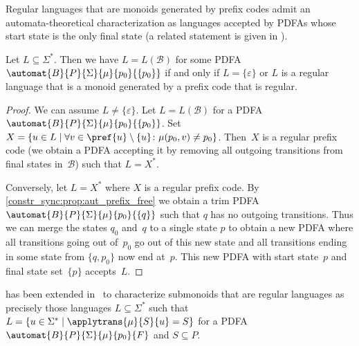 Regular languages that are monoids generated by prefix codes
admit an automata-theoretical characterization 
as languages
accepted by PDFAs
whose start state is the only final state (a related statement
is given in \cite[Prop.~3.2]{Eilenberg1974}).

\begin{theorem}
	\label{constr_sync:thm:regular_prefix_codes_and_automata}
	Let $L \subseteq \Sigma^*$.
	Then we have $L = L(\mathcal B)$
	for some PDFA $\automat{B}{P}{\Sigma}{\mu}{p_0}{\{p_0\}}$
	if and only if  $L = \{\varepsilon\}$ or $L$ is a regular language that is a monoid generated by a prefix code that is regular.
\end{theorem}
\begin{proof}	
	We can assume $L \ne \{\varepsilon\}$. Let $L = L(\mathcal B)$
	for a PDFA $\automat{B}{P}{\Sigma}{\mu}{p_0}{\{p_0\}}$.
	Set $X = \{ u \in  L \mid \forall v \in \pref{u} \setminus \{u\} \colon \mu(p_0, v) \ne p_0 \}$.
	Then~$X$ is a regular prefix code (we obtain a PDFA accepting it by removing all outgoing transitions
	from final states in~$\mathcal B$) such that $L = X^*$.
	
	Conversely, let $L = X^*$ where $X$ is a regular prefix code.
	By \cref{constr_sync:prop:aut_prefix_free} 
	we obtain a trim PDFA $\automat{B}{P}{\Sigma}{\mu}{p_0}{\{q\}}$
	such that $q$ has no outgoing transitions.
	Thus we can merge the states $q_0$ and~$q$ to a single
	state $p$ to obtain a new PDFA where all transitions going out of~$p_0$ go out of this new state
	and all transitions ending in some state from $\{q, p_0\}$
	now end at~$p$.
	This new PDFA with start state~$p$ and final state set~$\{p\}$
	accepts~$L$.
\end{proof}

 has been extended in~\cite[Thm.~3.2]{DBLP:conf/litp/Restivo88}
to characterize submonoids that are regular languages as precisely those languages $L \subseteq \Sigma^*$
such that $L = \{ u \in \Sigma^* \mid \applytrans{\mu}{S}{u} = S \}$ for a PDFA $\automat{B}{P}{\Sigma}{\mu}{p_0}{F}$
and $S \subseteq P$.

